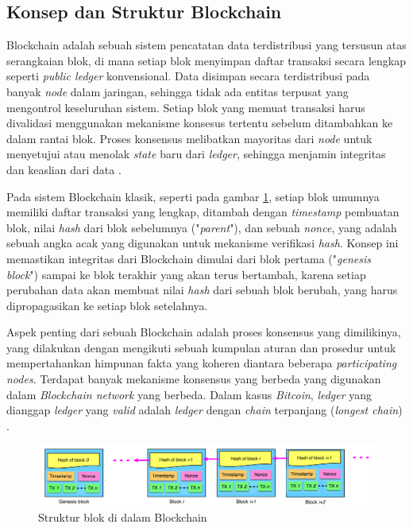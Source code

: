 \subsection{Konsep dan Struktur Blockchain}
\label{subsec:konsep-struktur-blockchain}

Blockchain adalah sebuah sistem pencatatan data terdistribusi yang tersusun atas serangkaian blok, di mana setiap blok menyimpan daftar transaksi secara lengkap seperti \textit{public ledger} konvensional. Data disimpan secara terdistribusi pada banyak \textit{node} dalam jaringan, sehingga tidak ada entitas terpusat yang mengontrol keseluruhan sistem. Setiap blok yang memuat transaksi harus divalidasi menggunakan mekanisme konsesus tertentu sebelum ditambahkan ke dalam rantai blok. Proses konsensus melibatkan mayoritas dari \textit{node} untuk menyetujui atau menolak \textit{state} baru dari \textit{ledger}, sehingga menjamin integritas dan keaslian dari data \parencite{zheng2018blockchain,nofer2017blockchain}.

Pada sistem Blockchain klasik, seperti pada gambar \ref{image:struktur-blockchain}, setiap blok umumnya memiliki daftar transaksi yang lengkap, ditambah dengan \textit{timestamp} pembuatan blok, nilai \textit{hash} dari blok sebelumnya ("\textit{parent}"), dan sebuah \textit{nonce}, yang adalah sebuah angka acak yang digunakan untuk mekanisme verifikasi \textit{hash}.
Konsep ini memastikan integritas dari Blockchain dimulai dari blok pertama ("\textit{genesis block}") sampai ke blok terakhir yang akan terus bertambah, karena setiap perubahan data akan membuat nilai \textit{hash} dari sebuah blok berubah, yang harus dipropagasikan ke setiap blok setelahnya.

Aspek penting dari sebuah Blockchain adalah proses konsensus yang dimilikinya, yang dilakukan dengan mengikuti sebuah kumpulan aturan dan prosedur untuk mempertahankan himpunan fakta yang koheren diantara beberapa \textit{participating nodes}. Terdapat banyak mekanisme konsensus yang berbeda yang digunakan dalam \textit{Blockchain network} yang berbeda. Dalam kasus \textit{Bitcoin}, \textit{ledger} yang dianggap \textit{ledger} yang \textit{valid} adalah \textit{ledger} dengan \textit{chain} terpanjang (\textit{longest chain}) \parencite{swanson2015consensus}.

\begin{figure}[ht]
	\centering
	\includegraphics[width=1\textwidth]{resources/chapter-2/struktur-blockchain.png}
	\caption{Struktur blok di dalam Blockchain \parencite{zheng2018blockchain}}
	\label{image:struktur-blockchain}
\end{figure}

